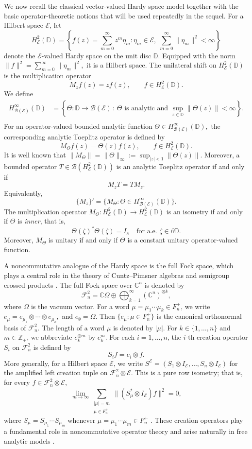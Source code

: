 \documentclass[12pt]{amsart}
\theoremstyle{definition}
\theoremstyle{remark}
\def \D{\mathbb{D}}
\def \Z{\mathbb{Z}}
\def \C{\mathbb{C}}
\newcommand{\clb}{\mathcal{B}}
\newcommand{\cle}{\mathcal{E}}
\newcommand{\clf}{\mathcal{F}}
\numberwithin{equation}{section}
\begin{document}
We now recall the classical vector-valued Hardy space model together with the basic operator-theoretic notions that will be used repeatedly in the sequel. For a Hilbert space $\cle$, let
\[
H^2_{\cle}(\D)
=
\left\{
f(z)=\sum_{m=0}^{\infty} z^m \eta_m :
\eta_m\in \cle,\;
\sum_{m=0}^{\infty}\|\eta_m\|^2<\infty
\right\}
\]
denote the \(\cle\)-valued Hardy space on the unit disc \(\D\).
Equipped with the norm $\|f\|^2 = \sum_{m=0}^{\infty}\|\eta_m\|^2,$
it is a Hilbert space. The unilateral shift on \(H^2_{\cle}(\D)\) is the multiplication operator
\[
M_z f(z)=z f(z),
\qquad f\in H^2_{\cle}(\D).
\]
We define
\begin{align*}
 H^\infty_{\clb(\cle)}(\D) &=
\left\{ \Theta:\D\to \clb(\cle)\,:\, \Theta \text{ is analytic and }
\sup_{z\in\D}\|\Theta(z)\|<\infty
\right\}. \\
\end{align*}
For an operator-valued bounded analytic function $\Theta \in H^\infty_{\clb(\cle)}(\D),$
the corresponding analytic Toeplitz operator is defined by
\[
M_\Theta f(z)=\Theta(z)f(z),
\qquad f\in H^2_{\cle}(\D).
\]
It is well known that $\|M_\Theta\|=\|\Theta\|_\infty
:=
\sup_{|z|<1}\|\Theta(z)\|.$ Moreover, a bounded operator $T\in \clb(H^2_{\cle}(\D))$ is an analytic Toeplitz operator if and only if \[ M_zT=TM_z. \] Equivalently, \[ \{M_z\}' = \{M_\Theta:\Theta\in H^\infty_{\clb(\cle)}(\D)\}. \]
The multiplication operator $M_\Theta:H^2_{\cle}(\D)\to H^2_{\cle}(\D)$ is an isometry if and only if $\Theta$ is \emph{inner}, that is,
\[
\Theta(\zeta)^*\Theta(\zeta)=I_\cle
\quad \text{for a.e. } \zeta\in \partial\D.
\]
Moreover, $M_\Theta$ is unitary if and only if $\Theta$ is a constant unitary operator-valued function.


A noncommutative analogue of the Hardy space is the full Fock space, which plays a central role in the theory of Cuntz--Pimsner algebras and semigroup crossed products \cite{davidson1996, Anica, pimsner1997}. The full Fock space over $\C^n$ is denoted by
\[
\clf_n^2=\C\Omega\oplus\bigoplus_{k=1}^{\infty}(\C^n)^{\otimes k},
\]
where $\Omega$ is the vacuum vector. For a word
$\mu=\mu_1\cdots\mu_k\in F_n^+$, we write $e_\mu=e_{\mu_1}\otimes\cdots\otimes e_{\mu_k},$
and $e_\emptyset=\Omega$. Then $\{e_\mu:\mu\in F_n^+\}$
is the canonical orthonormal basis of \(\clf_n^2\). The length of a word $\mu$ is denoted by $|\mu|$. For $k\in\{1,\ldots,n\}$ and $m\in \Z_+$, we abbreviate $e_k^{\otimes m}$ by $e_k^m$.
For each $i=1,\ldots,n$, the $i$-th creation operator $S_i$ on $\clf_n^2$ is defined by
\[
S_i f=e_i\otimes f.
\]
More generally, for a Hilbert space $\cle$, we write $S^\cle=(S_1\otimes I_\cle,\ldots,S_n\otimes I_\cle)$
for the amplified left creation tuple on $\clf_n^2\otimes\cle$. This is a pure row isometry; that is, for every  $f\in\clf_n^2\otimes\cle$,
\[
\lim_{m\to\infty}
\sum_{\substack{|\mu|=m\\ \mu\in F_n^+}}
\|(S_\mu^*\otimes I_\cle)f\|^2=0,
\]
where $S_\mu=S_{\mu_1}\cdots S_{\mu_m}$ whenever $ \mu=\mu_1\cdots\mu_m\in F_n^+$ \cite[Remark 1.1]{popescu1989}. These creation operators play a fundamental role in noncommutative operator theory and arise naturally in free analytic models \cite{Frazho,popescu18}.
\end{document}
